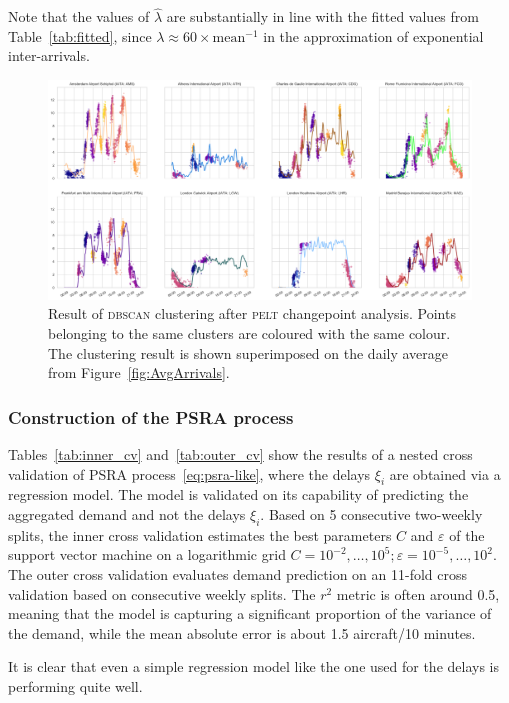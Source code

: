 \documentclass[draft,review]{elsarticle}
\newcommand{\PELT}{\textsc{pelt}}
\newcommand{\DBSCAN}{\textsc{dbscan}}
\begin{document}
\begin{rmk}
	Note that the values of \(\hat{\lambda}\) are substantially in line with the fitted values from Table~\ref{tab:fitted}, since \(\lambda \approx 60 \times \text{mean}^{-1}\) in the approximation of exponential inter-arrivals.
\end{rmk}

\begin{figure}
    \includegraphics[width=\textwidth]{DDPoisson}
    \caption{Result of \DBSCAN{} clustering after \PELT{} changepoint analysis. Points belonging to the same clusters are coloured with the same colour. The clustering result is shown superimposed on the daily average from Figure~\ref{fig:AvgArrivals}.}\label{fig:poisson_segmentation}
\end{figure}

\subsubsection{Construction of the \acs{PSRA} process}\label{sec:psra}

Tables~\ref{tab:inner_cv} and~\ref{tab:outer_cv} show the results of a nested cross validation of \ac{PSRA} process~\eqref{eq:psra-like}, where the delays \(\xi_i\) are obtained via a regression model.
The model is validated on its capability of predicting the aggregated demand and not the delays \(\xi_i\).
Based on 5 consecutive two-weekly splits, the inner cross validation estimates the best parameters \(C\) and \(\varepsilon\) of the support vector machine on a logarithmic grid \(C = 10^{-2},\ldots, 10^5; \varepsilon = 10^{-5},\dots,10^2\).
The outer cross validation evaluates demand prediction on an 11-fold cross validation based on consecutive weekly splits.
The \(r^2\) metric is often around 0.5, meaning that the model is capturing a significant proportion of the variance of the demand, while the mean absolute error is about 1.5 aircraft/10 minutes.
\begin{kpt}
  It is clear that even a simple regression model like the one used for the delays is performing quite well.
\end{kpt}
\end{document}
